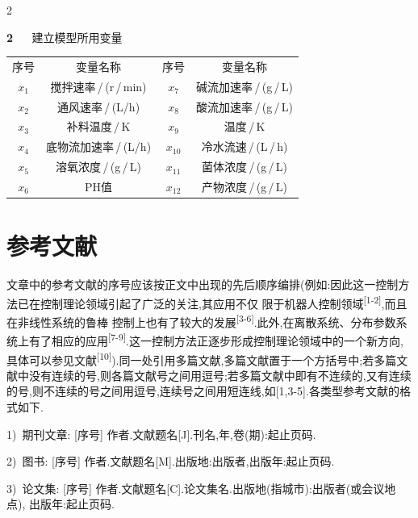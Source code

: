 \documentclass{ctacn}%
\begin{document}
\begin{multicols}{2}

\begin{center}
	{{\heiti{}\tablename\textbf{2}~\,~~建立模型所用变量}\vspace{5pt}}
	
	\renewcommand\tabcolsep{7pt}
	{\fontsize{7.5pt}{11.6pt}\selectfont
		\begin{tabular}{cc||cc}\bottomrule
			序号  &       变量名称 &       序号 &                 变量名称 \\\hhline{--||--}
			$x_1$  &       搅拌速率\,/\,(r\,/\,min)   &   $x_7$  &      碱流加速率\,/\,(g\,/\,L)       \\	
			$x_2$  &       通风速率\,/\,(L/h)     &   $x_8$  &      酸流加速率\,/\,(g\,/\,L)       \\	
			$x_3$  &       补料温度\,/\,K       &   $x_9$  &       温度\,/\,K\\	
			$x_4$  &       底物流加速率\,/\,(L/h) &  ${x_{10}}$  &       冷水流速\,/\,(L\,/\,h)\\
			$x_5$  &        溶氧浓度\,/\,(g\,/\,L)     &  ${x_{11}}$  &       菌体浓度\,/\,(g\,/\,L)\\
			$x_6$  &        PH值              &  ${x_{12}}$  &       产物浓度\,/\,(g\,/\,L)\\[-2pt]
			\bottomrule
	\end{tabular}}
\end{center}

\section{参考文献}
文章中的参考文献的序号应该按正文中出现的先后顺序编排(例如:因此这一控制方法已在控制理论领域引起了广泛的关注,其应用不仅
限于机器人控制领域\textsuperscript{[1-2]},而且在非线性系统的鲁棒
控制上也有了较大的发展\textsuperscript{[3-6]}.\;此外,在离散系统、分布参数系统上有了相应的应用\textsuperscript{[7-9]}.\;这一控制方法正逐步形成控制理论领域中的一个新方向,具体可以参见文献\textsuperscript{[10]}).\;同一处引用多篇文献,多篇文献置于一个方括号中;若多篇文献中没有连续的号,则各篇文献号之间用逗号;若多篇文献中即有不连续的,又有连续的号,则不连续的号之间用逗号,连续号之间用短连线,如[1,3-5].\;各类型参考文献的格式如下.

1)~期刊文章:
[序号] 作者.\;文献题名[J].\;刊名,年,卷(期):起止页码.


2)~图书:
[序号] 作者.\;文献题名[M].\;出版地:出版者,出版年:起止页码.

3)~论文集:
[序号] 作者.\;文献题名[C].\;论文集名.\;出版地(指城市):出版者(或会议地点), 出版年:起止页码.


\end{multicols}
\end{document}
